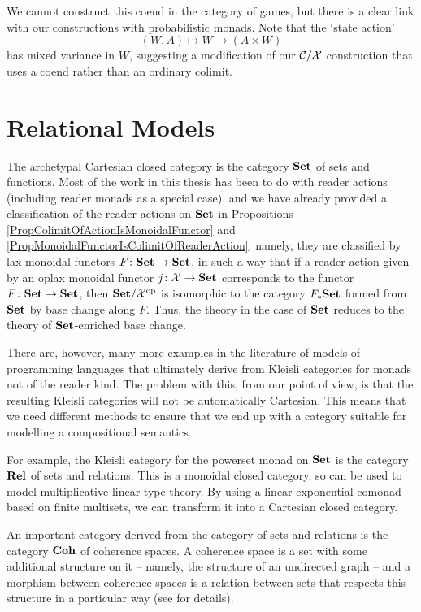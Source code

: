 We cannot construct this coend in the category of games, but there is a clear link with our constructions with probabilistic monads.  
Note that the `state action'
\[
  (W, A) \mapsto W \to (A \times W)
  \]
has mixed variance in $W$, suggesting a modification of our ${\mathcal{C}}/\mathcal X$ construction that uses a coend rather than an ordinary colimit.

\section{Relational Models}

The archetypal Cartesian closed category is the category ${\normalfont\textbf{Set}}$ of sets and functions.  
Most of the work in this thesis has been to do with reader actions (including reader monads as a special case), and we have already provided a classification of the reader actions on ${\normalfont\textbf{Set}}$ in Propositions \ref{PropColimitOfActionIsMonoidalFunctor} and \ref{PropMonoidalFunctorIsColimitOfReaderAction}: namely, they are classified by lax monoidal functors $F\colon{\normalfont\textbf{Set}} \to {\normalfont\textbf{Set}}$, in such a way that if a reader action given by an oplax monoidal functor $j\colon\mathcal X \to {\normalfont\textbf{Set}}$ corresponds to the functor $F \colon {\normalfont\textbf{Set}} \to {\normalfont\textbf{Set}}$, then ${\normalfont\textbf{Set}}/\mathcal X^{\mathrm{op}}$ is isomorphic to the category $F_*{\normalfont\textbf{Set}}$ formed from ${\normalfont\textbf{Set}}$ by base change along $F$.
Thus, the theory in the case of ${\normalfont\textbf{Set}}$ reduces to the theory of ${\normalfont\textbf{Set}}$-enriched base change.

There are, however, many more examples in the literature of models of programming languages that ultimately derive from Kleisli categories for monads not of the reader kind.  
The problem with this, from our point of view, is that the resulting Kleisli categories will not be automatically Cartesian.  
This means that we need different methods to ensure that we end up with a category suitable for modelling a compositional semantics.

For example, the Kleisli category for the powerset monad on ${\normalfont\textbf{Set}}$ is the category ${\normalfont\textbf{Rel}}$ of sets and relations.  
This is a monoidal closed category, so can be used to model multiplicative linear type theory.
By using a linear exponential comonad based on finite multisets, we can transform it into a Cartesian closed category.

An important category derived from the category of sets and relations is the category ${\normalfont\textbf{Coh}}$ of coherence spaces.  
A coherence space is a set with some additional structure on it -- namely, the structure of an undirected graph -- and a morphism between coherence spaces is a relation between sets that respects this structure in a particular way (see \cite{MelliesCoherence} for details).  

